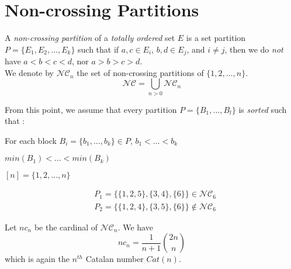 \section{Non-crossing Partitions}

\begin{definition}
    A \emph{non-crossing partition} of a \emph{totally
    ordered} set $E$ is
    a set partition $P = \{E_1, E_2, \ldots, E_k\}$ such that
    if $a, c \in E_i$, $b, d \in E_j$, and $i \neq j$, then
    we do \emph{not} have $a < b < c < d$, nor $a > b > c > d$.\\
    We denote by $\mathcal{NC}_n$ the set of non-crossing partitions
    of $\{1, 2, \ldots, n\}$.
    $$\mathcal{NC} = \bigcup_{n > 0}{\mathcal{NC}_n}$$
\end{definition}

From this point, we assume that every partition $P = \{B_1, \ldots, B_l\}$
is \emph{sorted} such that :\\
\begin{itemize*}
    \item For each block $B_i = \{b_1, \ldots, b_k\} \in P$,
        $b_1 < \ldots < b_k$\\
    \item $min (B_1) < \ldots < min (B_k)$\\
\end{itemize*}

\begin{notation}
    $[n] = \{1, 2, \ldots, n\}$
\end{notation}

\begin{example}[$E = \lbrack 6 \rbrack $]
    \begin{align*}
        &P_1 = \{\{1, 2, 5\}, \{3, 4\}, \{6\}\} \in \mathcal{NC}_6\\
        &P_2 = \{\{1, 2, 4\}, \{3, 5\}, \{6\}\} \notin \mathcal{NC}_6
    \end{align*}
\end{example}

\begin{theorem}
    Let $nc_n$ be the cardinal of $\mathcal{NC}_n$.
    We have $$nc_n = \frac{1}{n + 1} \binom{2n}{n}$$
    which is again the $n^{th}$ Catalan number
    $Cat(n)$.
\end{theorem}

